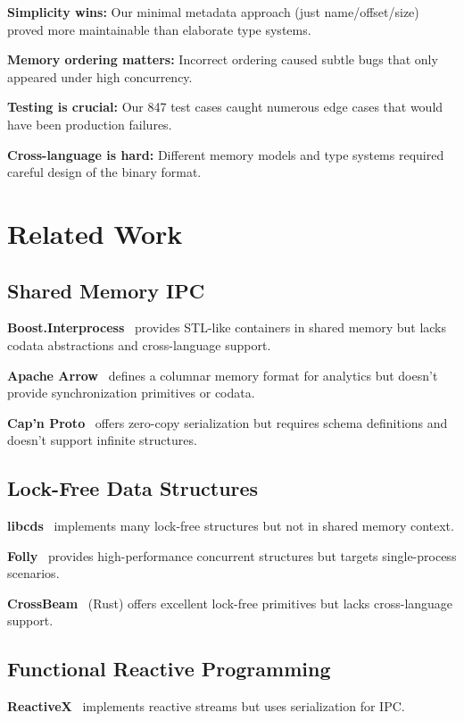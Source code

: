 \documentclass[letterpaper,twocolumn,10pt]{article}
\begin{document}
\textbf{Simplicity wins:} Our minimal metadata approach (just name/offset/size) proved more maintainable than elaborate type systems.

\textbf{Memory ordering matters:} Incorrect ordering caused subtle bugs that only appeared under high concurrency.

\textbf{Testing is crucial:} Our 847 test cases caught numerous edge cases that would have been production failures.

\textbf{Cross-language is hard:} Different memory models and type systems required careful design of the binary format.

\section{Related Work}

\subsection{Shared Memory IPC}

\textbf{Boost.Interprocess}~\cite{boost} provides STL-like containers in shared memory but lacks codata abstractions and cross-language support.

\textbf{Apache Arrow}~\cite{arrow} defines a columnar memory format for analytics but doesn't provide synchronization primitives or codata.

\textbf{Cap'n Proto}~\cite{capnproto} offers zero-copy serialization but requires schema definitions and doesn't support infinite structures.

\subsection{Lock-Free Data Structures}

\textbf{libcds}~\cite{libcds} implements many lock-free structures but not in shared memory context.

\textbf{Folly}~\cite{folly} provides high-performance concurrent structures but targets single-process scenarios.

\textbf{CrossBeam}~\cite{crossbeam} (Rust) offers excellent lock-free primitives but lacks cross-language support.

\subsection{Functional Reactive Programming}

\textbf{ReactiveX}~\cite{reactivex} implements reactive streams but uses serialization for IPC.
\end{document}
